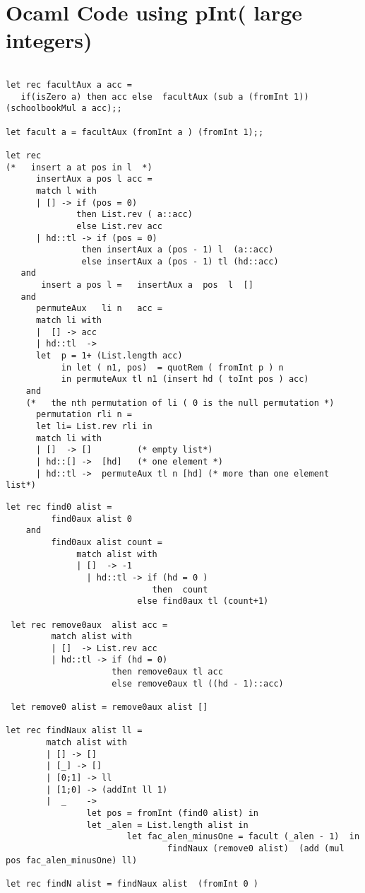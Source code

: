 \documentclass{article} %
\begin{document}
\newpage
 \section{Ocaml Code using pInt( large integers) } %
\begin{lstlisting}

let rec facultAux a acc =
   if(isZero a) then acc else  facultAux (sub a (fromInt 1)) (schoolbookMul a acc);;
   
let facult a = facultAux (fromInt a ) (fromInt 1);;

let rec 
(*   insert a at pos in l  *)
      insertAux a pos l acc =  
      match l with 
      | [] -> if (pos = 0) 
              then List.rev ( a::acc) 
              else List.rev acc 
      | hd::tl -> if (pos = 0) 
               then insertAux a (pos - 1) l  (a::acc)
               else insertAux a (pos - 1) tl (hd::acc)
   and
       insert a pos l =   insertAux a  pos  l  []
   and   
      permuteAux   li n   acc =
      match li with 
      |  [] -> acc
      | hd::tl  -> 
      let  p = 1+ (List.length acc) 
           in let ( n1, pos)  = quotRem ( fromInt p ) n
           in permuteAux tl n1 (insert hd ( toInt pos ) acc)
    and
    (*   the nth permutation of li ( 0 is the null permutation *)
      permutation rli n =
      let li= List.rev rli in
      match li with 
      | []  -> []         (* empty list*)
      | hd::[] ->  [hd]   (* one element *)
      | hd::tl ->  permuteAux tl n [hd] (* more than one element list*)
\end{lstlisting}
\newpage
\begin{lstlisting}
let rec find0 alist =  
	     find0aux alist 0 
	and
	     find0aux alist count =
	          match alist with
	          | []  -> -1
         		| hd::tl -> if (hd = 0 ) 
                     		 then  count
	                      else find0aux tl (count+1)
 
 let rec remove0aux  alist acc =
 		 match alist with 
 		 | []  -> List.rev acc
 		 | hd::tl -> if (hd = 0)
 		             then remove0aux tl acc
 		             else remove0aux tl ((hd - 1)::acc)
 
 let remove0 alist = remove0aux alist []
        
let rec findNaux alist ll =
        match alist with
        | [] -> []
        | [_] -> []
        | [0;1] -> ll 
        | [1;0] -> (addInt ll 1) 
        |  _    -> 
                let pos = fromInt (find0 alist) in
                let _alen = List.length alist in
        				let fac_alen_minusOne = facult (_alen - 1)  in   
			 					findNaux (remove0 alist)  (add (mul pos fac_alen_minusOne) ll) 

let rec findN alist = findNaux alist  (fromInt 0 )     
		
			 
\end{lstlisting}
       
\end{document}
